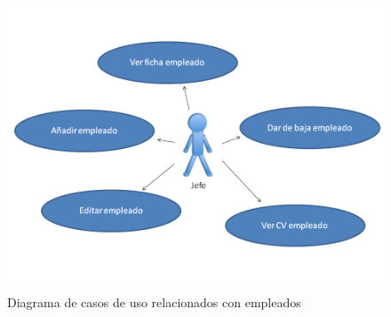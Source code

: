 \documentclass[spanish,a4paper,11pt, twoside]{report}	%
\begin{document}
	\begin{figure}[!h]
		\centering
		\includegraphics[scale=0.5]{empleados.png}
		\caption{Diagrama de casos de uso relacionados con empleados}
	\end{figure}
	\newpage

\end{document}
